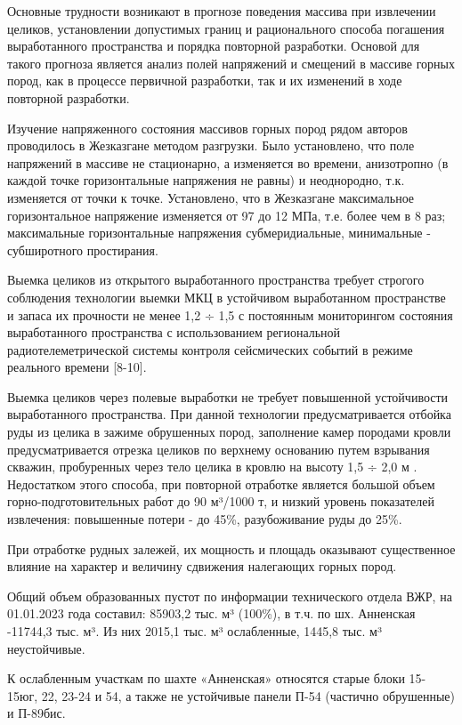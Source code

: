 Основные трудности возникают в прогнозе поведения массива при извлечении
целиков, установлении допустимых границ и рационального способа
погашения выработанного пространства и порядка повторной разработки.
Основой для такого прогноза является анализ полей напряжений и смещений
в массиве горных пород, как в процессе первичной разработки, так и их
изменений в ходе повторной разработки.

Изучение напряженного состояния массивов горных пород рядом авторов
проводилось в Жезказгане методом разгрузки. Было установлено, что поле
напряжений в массиве не стационарно, а изменяется во времени,
анизотропно (в каждой точке горизонтальные напряжения не равны) и
неоднородно, т.к. изменяется от точки к точке. Установлено, что в
Жезказгане максимальное горизонтальное напряжение изменяется от 97 до 12
МПа, т.е. более чем в 8 раз; максимальные горизонтальные напряжения
субмеридиальные, минимальные - субширотного простирания.

Выемка целиков из открытого выработанного пространства требует строгого
соблюдения технологии выемки МКЦ в устойчивом выработанном пространстве
и запаса их прочности не менее 1,2 ÷ 1,5 с постоянным мониторингом
состояния выработанного пространства с использованием региональной
радиотелеметрической системы контроля сейсмических событий в режиме
реального времени {[}8-10{]}.

Выемка целиков через полевые выработки не требует повышенной
устойчивости выработанного пространства. При данной технологии
предусматривается отбойка руды из целика в зажиме обрушенных пород,
заполнение камер породами кровли предусматривается отрезка целиков по
верхнему основанию путем взрывания скважин, пробуренных через тело
целика в кровлю на высоту 1,5 ÷ 2,0 м . Недостатком этого способа, при
повторной отработке является большой объем горно-подготовительных работ
до 90 м³/1000 т, и низкий уровень показателей извлечения: повышенные
потери - до 45\%, разубоживание руды до 25\%.

При отработке рудных залежей, их мощность и площадь оказывают
существенное влияние на характер и величину сдвижения налегающих горных
пород.

Общий объем образованных пустот по информации технического отдела ВЖР,
на 01.01.2023 года составил: 85903,2 тыс. м³ (100\%), в т.ч. по шх.
Анненская -11744,3 тыс. м³. Из них 2015,1 тыс. м³ ослабленные, 1445,8
тыс. м³ неустойчивые.

К ослабленным участкам по шахте «Анненская» относятся старые блоки
15-15юг, 22, 23-24 и 54, а также не устойчивые панели П-54 (частично
обрушенные) и П-89бис.

